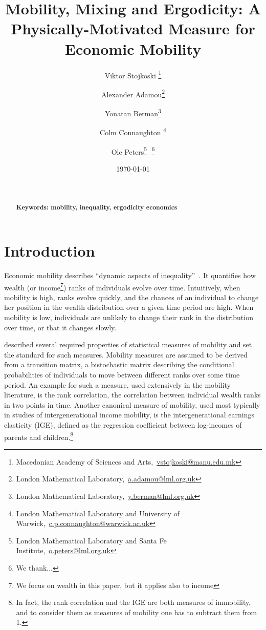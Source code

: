 \documentclass[11pt]{article}
\newcommand{\bc}{\begin{center}}
\newcommand{\ec}{\end{center}}
\newcommand{\red}[1]{{\color{red} #1}}
\numberwithin{equation}{section}
\begin{document}
\begin{titlepage}
\title{Mobility, Mixing and Ergodicity: A Physically-Motivated Measure for Economic Mobility}
\author{Viktor Stojkoski \footnote{Macedonian Academy of Sciences and Arts,~\url{vstojkoski@manu.edu.mk}} \and Alexander Adamou\footnote{London Mathematical Laboratory,~\url{a.adamou@lml.org.uk}} \and Yonatan Berman\footnote{London Mathematical Laboratory,~\url{y.berman@lml.org.uk}} \and Colm Connaughton \footnote{London Mathematical Laboratory and University of Warwick,~\url{c.p.connaughton@warwick.ac.uk}} \and Ole Peters\footnote{London Mathematical Laboratory and Santa Fe Institute,~\url{o.peters@lml.org.uk}}\,\, \thanks{We thank...}}
\date{\today}
\maketitle
\begin{abstract}
\noindent 
\\
\\
\noindent\textbf{Keywords: mobility, inequality, ergodicity economics}
\end{abstract}
\setcounter{page}{0}
\thispagestyle{empty}
\end{titlepage}
\pagebreak \newpage
\section{Introduction}\label{sec:introduction}
Economic mobility describes ``dynamic aspects of inequality''~\citep{Shorrocks1978}. It quantifies how wealth (or income\footnote{We focus on wealth in this paper, but it applies also to income}) ranks of individuals evolve over time. Intuitively, when mobility is high, ranks evolve quickly, and the chances of an individual to change her position in the wealth distribution over a given time period are high. When mobility is low, individuals are unlikely to change their rank in the distribution over time, or that it changes slowly.

\citet{Shorrocks1978} described several required properties of statistical measures of mobility and set the standard for such measures. Mobility measures are assumed to be derived from a transition matrix, a bistochastic matrix describing the conditional probabilities of individuals to move between different ranks over some time period. An example for such a measure, used extensively in the mobility literature, is the rank correlation, the correlation between individual wealth ranks in two points in time. Another canonical measure of mobility, used most typically in studies of intergenerational income mobility, is the intergenerational earnings elasticity (IGE), defined as the regression coefficient between log-incomes of parents and children.\footnote{In fact, the rank correlation and the IGE are both measures of immobility, and to consider them as measures of mobility one has to subtract them from 1.}
\end{document}
